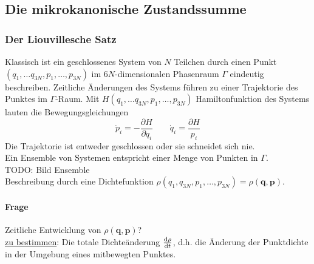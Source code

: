 \subsection{Die mikrokanonische Zustandssumme}
\subsubsection{Der Liouvillesche Satz}
Klassisch ist ein geschlossenes System von $N$ Teilchen durch einen Punkt \\ $(q_1,\ldots q_{3N}, p_1, \ldots, p_{3N})$ im $6N$-dimensionalen Phasenraum
$\Gamma$ eindeutig beschreiben. Zeitliche Änderungen des Systems führen zu einer Trajektorie des Punktes im $\Gamma$-Raum. Mit
$H(q_1,\ldots q_{3N}, p_1, \ldots, p_{3N})$ Hamiltonfunktion des Systems lauten die Bewegungsgleichungen
\begin{equation}
    \dot{p}_i = - \frac{\partial H}{\partial q_i} \qquad \dot{q}_i = \frac{\partial H}{p_i}
\end{equation}
Die Trajektorie ist entweder geschlossen oder sie schneidet sich nie. \\
Ein Ensemble von Systemen entspricht einer Menge von Punkten in $\Gamma$. \\
TODO: Bild Ensemble \\ %
Beschreibung durch eine Dichtefunktion $\rho(q_1, q_{3N}, p_1, \ldots, p_{3N}) = \rho(\textbf{q}, \textbf{p})$.
\paragraph{Frage} Zeitliche Entwicklung von $\rho(\textbf{q}, \textbf{p})$? \\
\underline{zu bestimmen}: Die totale Dichteänderung $\frac{\mathrm{d} \rho}{\mathrm{d} t}$, d.h. die Änderung der Punktdichte
in der Umgebung eines mitbewegten Punktes.
